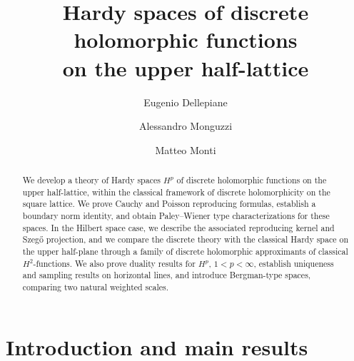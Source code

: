 \documentclass[12pt,a4paper,reqno]{amsart}
\title[Discrete Hardy spaces on the half-lattice]{Hardy spaces of discrete holomorphic functions \\on the upper half-lattice}
\date{}
\author[E. Dellepiane]{Eugenio Dellepiane \orcidlink{0009-0005-3432-2053}}
\author[A. Monguzzi]{Alessandro Monguzzi \orcidlink{0000-0003-3233-5000}}
\author[M. Monti]{Matteo  Monti\orcidlink{0000-0001-6848-5938}}
\theoremstyle{definition}
\theoremstyle{definition}\newtheorem{defn}[thm]{Definition}
\begin{document}
    \begin{abstract}
    We develop a theory of Hardy spaces $H^p$ of discrete holomorphic functions on
    the upper half-lattice, within the classical framework of discrete
    holomorphicity on the square lattice. We prove Cauchy and Poisson reproducing
    formulas, establish a boundary norm identity, and obtain Paley--Wiener type
    characterizations for these spaces. In the Hilbert space case, we describe the
    associated reproducing kernel and Szeg\H{o} projection, and we compare the
    discrete theory with the classical Hardy space on the upper half-plane through
    a family of discrete holomorphic approximants of classical $H^2$-functions. We
    also prove duality results for $H^p$, $1<p<\infty$, establish uniqueness and
    sampling results on horizontal lines, and introduce Bergman-type spaces,
    comparing two natural weighted scales.
    \end{abstract}
    \maketitle
    
    
    
    
    
    
    \section{Introduction and main results}
    
\end{document}
